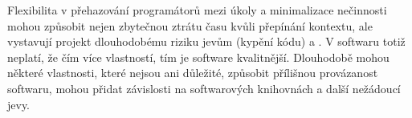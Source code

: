 \documentclass[10pt]{article}
\begin{document}
Flexibilita v přehazování programátorů mezi úkoly a minimalizace nečinnosti
mohou způsobit nejen zbytečnou ztrátu času kvůli přepínání kontextu, ale
vystavují projekt dlouhodobému riziku jevům  (kypění kódu) a
. V softwaru totiž neplatí, že čím více vlastností, tím je
software kvalitnější. Dlouhodobě mohou některé vlastnosti, které nejsou ani
důležité, způsobit přílišnou provázanost softwaru, mohou přidat závislosti na
softwarových knihovnách a další nežádoucí jevy. 







\end{document}
